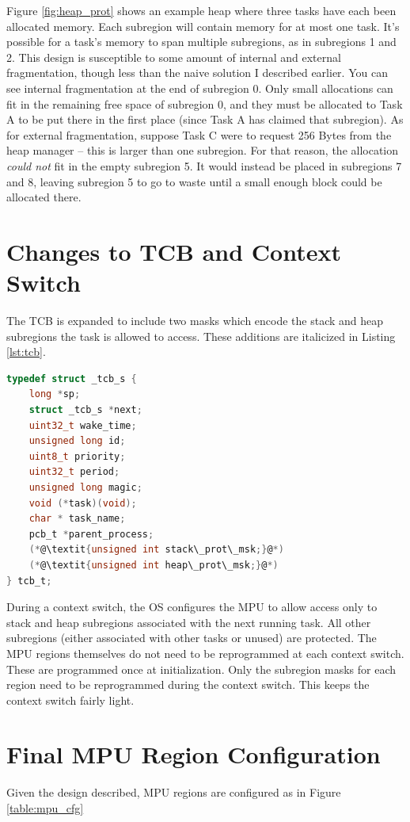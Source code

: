 Figure \ref{fig:heap_prot} shows an example heap where three tasks have each been allocated memory. Each subregion will contain memory for at most one task. It's possible for a task's memory to span multiple subregions, as in subregions 1 and 2. This design is susceptible to some amount of internal and external fragmentation, though less than the naive solution I described earlier. You can see internal fragmentation at the end of subregion 0. Only small allocations can fit in the remaining free space of subregion 0, and they must be allocated to Task A to be put there in the first place (since Task A has claimed that subregion). As for external fragmentation, suppose Task C were to request 256 Bytes from the heap manager -- this is larger than one subregion. For that reason, the allocation \textit{could not} fit in the empty subregion 5. It would instead be placed in subregions 7 and 8, leaving subregion 5 to go to waste until a small enough block could be allocated there.

\section{Changes to TCB and Context Switch}

The TCB is expanded to include two masks which encode the stack and heap subregions the task is allowed to access. These additions are italicized in Listing \ref{lst:tcb}.

\begin{lstlisting}[language=c, caption={TCB struct definition}, captionpos=b, label={lst:tcb}]
typedef struct _tcb_s {
    long *sp;
    struct _tcb_s *next;
    uint32_t wake_time;
    unsigned long id;
    uint8_t priority;
    uint32_t period;
    unsigned long magic;
    void (*task)(void);
    char * task_name;
    pcb_t *parent_process;
    (*@\textit{unsigned int stack\_prot\_msk;}@*)
    (*@\textit{unsigned int heap\_prot\_msk;}@*)
} tcb_t;
\end{lstlisting}

During a context switch, the OS configures the MPU to allow access only to stack and heap subregions associated with the next running task. All other subregions (either associated with other tasks or unused) are protected. The MPU regions themselves do not need to be reprogrammed at each context switch. These are programmed once at initialization. Only the subregion masks for each region need to be reprogrammed during the context switch. This keeps the context switch fairly light.

\section{Final MPU Region Configuration}

Given the design described, MPU regions are configured as in Figure \ref{table:mpu_cfg}



